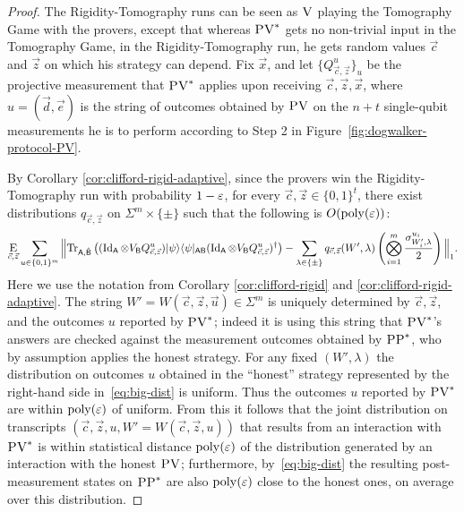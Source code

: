 \begin{proof}
The Rigidity-Tomography runs can be seen as $\textsc{V}$ playing the Tomography Game
  with the provers, except that whereas $\textsc{PV}^*$ gets no non-trivial input in the
  Tomography Game, in the Rigidity-Tomography run, he gets random values
  $\vec{c}$ and $\vec{z}$ on which his strategy can depend. Fix $\vec{x}$, and let
  $\{Q_{\vec{c},\vec{z}}^{u}\}_{u}$ be the projective measurement that $\textsc{PV}^*$
  applies upon receiving $\vec{c},\vec{z},\vec{x}$, where  $u = (\vec{d},\vec{e})$ is
  the string of outcomes obtained by $\textsc{PV}$ on the $n+t$ single-qubit
  measurements he is to perform according to Step 2 in
  Figure~\ref{fig:dogwalker-protocol-PV}. 

By Corollary \ref{cor:clifford-rigid-adaptive}, since the provers win the Rigidity-Tomography run with probability $1-\varepsilon$, for every $\vec{c},\vec{z}\in\{0,1\}^t$,
there exist distributions $q_{\vec{c},\vec{z}}$ on $\Sigma^m\times\{\pm\}$ such that the following is $O(\mathrm{poly}(\varepsilon))$:
\begin{equation}\label{eq:big-dist}
\mathop{\textsc{E}}_{\vec{c},\vec{z}}\sum_{ u\in \{0, 1\}^m}
\Big\| \mbox{\rm Tr}_{{\textsf{A}},\hat{{\textsf{B}}}}\left((\mathop{\rm Id}\nolimits_{{\textsf{A}}}\otimes V_{{\textsf{B}}} Q_{\vec{c},\vec{z}}^{u})|\psi\rangle\langle\psi|_{{\textsf{AB}}}(\mathop{\rm Id}\nolimits_{{\textsf{A}}}\otimes V_{{\textsf{B}}} Q_{\vec{c},\vec{z}}^{u})^\dagger\right)
- \sum_{\lambda\in\{\pm\}}q_{\vec{c},\vec{z}}(W',\lambda)\left(\bigotimes_{i=1}^m \frac{\sigma^{u_i}_{W_i',\lambda}}{2}\right)\Big\|_1. 
\end{equation}
Here we use the notation from Corollary \ref{cor:clifford-rigid} and
  \ref{cor:clifford-rigid-adaptive}. The string
  $W'=W(\vec{c},\vec{z},\vec{u})\in\Sigma^m$ is uniquely determined by
  $\vec{c},\vec{z}$, and the outcomes ${u}$ reported by $\textsc{PV}^*$; indeed it
  is using this string that $\textsc{PV}^*$'s answers are checked against the
  measurement outcomes obtained by $\textsc{PP}^*$, who by assumption applies the
  honest strategy. For any fixed $(W',\lambda)$ the distribution on
  outcomes $u$ obtained in the ``honest'' strategy represented by the right-hand
  side in~\eqref{eq:big-dist} is uniform. Thus the outcomes $u$ reported by
  $\textsc{PV}^*$ are within $\operatorname{poly}(\varepsilon)$ of uniform. From this it follows that the joint distribution on transcripts $(\vec{c},\vec{z},u,W'=W(\vec{c},\vec{z},u))$ that results from an interaction with $\textsc{PV}^*$ is within statistical distance $\operatorname{poly}(\varepsilon)$ of the distribution generated by an interaction with the honest $\textsc{PV}$; furthermore, by~\eqref{eq:big-dist} the resulting post-measurement states on $\textsc{PP}^*$ are also $\operatorname{poly}(\varepsilon)$ close to the honest ones, on average over this distribution. 


\end{proof}
